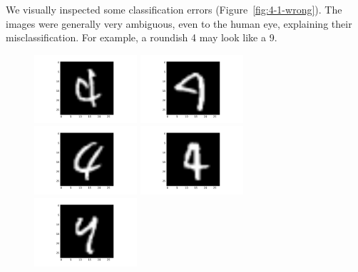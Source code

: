 \documentclass{article}
\begin{document}
\begin{multicols}{2}
We visually inspected some classification errors (Figure~\ref{fig:4-1-wrong}).
The images were generally very ambiguous, even to the human eye,
explaining their misclassification.
For example, a roundish 4 may look like a 9.

\begin{figure}[t]
   \centering
   \includegraphics[width=1.5in]{img/4-1-wrong/4-1-wrong-11.pdf} \hspace{-.25in}
   \includegraphics[width=1.5in]{img/4-1-wrong/4-1-wrong-35.pdf} \hspace{-.25in}
   \includegraphics[width=1.5in]{img/4-1-wrong/4-1-wrong-68.pdf} \hspace{-.25in}
   \includegraphics[width=1.5in]{img/4-1-wrong/4-1-wrong-82.pdf} \hspace{-.25in}
   \includegraphics[width=1.5in]{img/4-1-wrong/4-1-wrong-138.pdf} \hspace{-.25in}
   

\end{figure}
\end{multicols}
\end{document}
